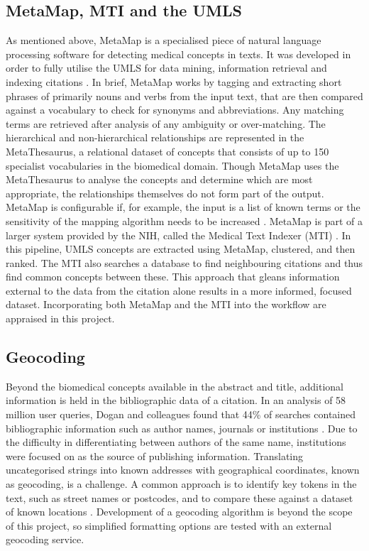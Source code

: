 \documentclass[Report.tex]{subfiles}
\begin{document}
\subsection{MetaMap, MTI and the UMLS}
As mentioned above, MetaMap is a specialised piece of natural language processing software for detecting medical concepts in texts. It was developed in order to fully utilise the UMLS for data mining, information retrieval and indexing citations \cite{metamap2000}. In brief, MetaMap works by tagging and extracting short phrases of primarily nouns and verbs from the input text, that are then compared against a vocabulary to check for synonyms and abbreviations. Any matching terms are retrieved after analysis of any ambiguity or over-matching. The hierarchical and non-hierarchical relationships are represented in the MetaThesaurus, a relational dataset of concepts that consists of up to 150 specialist vocabularies in the biomedical domain. Though MetaMap uses the MetaThesaurus to analyse the concepts and determine which are most appropriate, the relationships themselves do not form part of the output. MetaMap is configurable if, for example, the input is a list of known terms or the sensitivity of the mapping algorithm needs to be increased \cite{metamap2010}. MetaMap is part of a larger system provided by the NIH, called the Medical Text Indexer (MTI) \cite{mti}. In this pipeline, UMLS concepts are extracted using MetaMap, clustered, and then ranked. The MTI also searches a database to find neighbouring citations and thus find common concepts between these. This approach that gleans information external to the data from the citation alone results in a more informed, focused dataset. Incorporating both MetaMap and the MTI into the workflow are appraised in this project.
 
\subsection{Geocoding}
Beyond the biomedical concepts available in the abstract and title, additional information is held in the bibliographic data of a citation. In an analysis of 58 million user queries, Dogan and colleagues found that 44\% of searches contained bibliographic information such as author names, journals or institutions \cite{dogan}. Due to the difficulty in differentiating between authors of the same name, institutions were focused on as the source of publishing information. Translating uncategorised strings into known addresses with geographical coordinates, known as geocoding, is a challenge. A common approach is to identify key tokens in the text, such as street names or postcodes, and to compare these against a dataset of known locations \cite{goldberg2007text}. Development of a geocoding algorithm is beyond the scope of this project, so simplified formatting options are tested with an external geocoding service.
\end{document}
